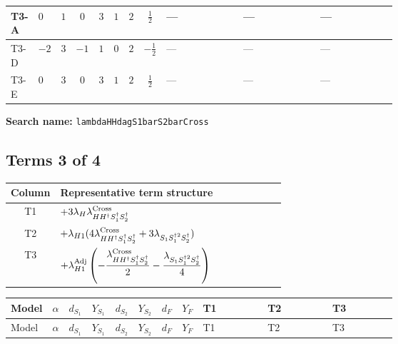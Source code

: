 \documentclass[8pt]{article}
\begin{document}
\begin{landscape}
\begin{longtable}{@{}llcccccc >{\raggedright\arraybackslash}p{0.21\linewidth} >{\raggedright\arraybackslash}p{0.21\linewidth} >{\raggedright\arraybackslash}p{0.21\linewidth}@{}}
\midrule
T3-A & $0$ & $1$ & $0$ & $3$ & $1$ & $2$ & $\frac{1}{2}$ & --- & --- & --- \\
\midrule
T3-D & $-2$ & $3$ & $-1$ & $1$ & $0$ & $2$ & $-\frac{1}{2}$ & --- & --- & --- \\
\midrule
T3-E & $0$ & $3$ & $0$ & $3$ & $1$ & $2$ & $\frac{1}{2}$ & --- & --- & --- \\
\midrule
\bottomrule
\end{longtable}
\clearpage
\noindent\textbf{Search name: }\texttt{lambdaHHdagS1barS2barCross}\par\smallskip
\subsection*{Terms 3 of 4}
\begin{center}
\begin{tabular}{@{}c >{\raggedright\arraybackslash}p{0.82\linewidth}@{}}
\toprule
Column & Representative term structure \\
\midrule
T1 & \(\displaystyle +3 {\lambda_H} {\lambda_{H H^\dagger S_1^\dagger S_2^\dagger}^{\rm Cross}}\) \\
\midrule
T2 & \(\displaystyle +{\lambda_{H1}} (4 {\lambda_{H H^\dagger S_1^\dagger S_2^\dagger}^{\rm Cross}}+3 {\lambda_{S_1 S_1^{\dagger 2}S_2^\dagger}})\) \\
\midrule
T3 & \(\displaystyle +{\lambda_{H1}^{\rm Adj}} \left(-\frac{{\lambda_{H H^\dagger S_1^\dagger S_2^\dagger}^{\rm Cross}}}{2}-\frac{{\lambda_{S_1 S_1^{\dagger 2}S_2^\dagger}}}{4}\right)\) \\
\midrule
\bottomrule
\end{tabular}
\end{center}
\smallskip
\tiny
\begin{longtable}{@{}llcccccc >{\raggedright\arraybackslash}p{0.21\linewidth} >{\raggedright\arraybackslash}p{0.21\linewidth} >{\raggedright\arraybackslash}p{0.21\linewidth}@{}}
\toprule
Model & $\alpha$ & $d_{S_1}$ & $Y_{S_1}$ & $d_{S_2}$ & $Y_{S_2}$ & $d_F$ & $Y_F$ & T1 & T2 & T3 \\
\midrule
\endfirsthead
\toprule
Model & $\alpha$ & $d_{S_1}$ & $Y_{S_1}$ & $d_{S_2}$ & $Y_{S_2}$ & $d_F$ & $Y_F$ & T1 & T2 & T3 \\
\midrule
\endhead

\end{longtable}
\end{landscape}
\end{document}

